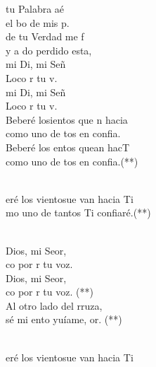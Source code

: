 \begin{cancion}[Hacia Ti][Ixcís]%
	tu Palabra aé\\
	el bo de mis p.\\
	de tu Verdad me f\\
	y a do perdido esta,\\
	mi Di, mi Señ\\
	Loco  r tu v. \\
	mi Di, mi Señ\\
	Loco  r tu v.\\
\jump
	Beberé losientos que n hacia\\
	como uno de tos en  confia.\\
	Beberé los entos quean hacT\\
	como uno de tos en  confia.(**)\\\jump\\
	\begin{chorus}%
	eré los vientosue van hacia Ti\\
	mo uno de tantos Ti confiaré.(**)\\
	\end{chorus}%
	\jump\\
	Dios, mi Seor,\\
	co por r tu voz.\\
	Dios, mi Seor,\\
	co por r tu voz. (**)\\
\jump
	Al otro lado del rruza,\\
	sé mi ento yuíame, or. (**) \\\jump\\
	\begin{chorus}%
	eré los vientosue van hacia Ti\\

\end{chorus}
\end{cancion}
